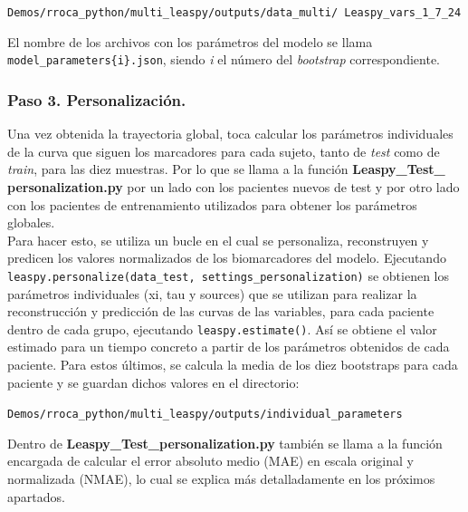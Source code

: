 \begin{center}
	\texttt{Demos/rroca\_python/multi\_leaspy/outputs/data\_multi/
		Leaspy\_vars\_1\_7\_24}
\end{center}

El nombre de los archivos con los parámetros del modelo se llama\\
\texttt{model\_parameters\{i\}.json}, siendo \textit{i} el número del \textit{bootstrap} correspondiente.\\
	
	
\subsubsection{Paso 3. Personalización.}
	
Una vez obtenida la trayectoria global, toca calcular los parámetros individuales de la curva que siguen los marcadores para cada sujeto, tanto de \textit{test} como de \textit{train}, para las diez muestras. Por lo que se llama a la función \textbf{Leaspy\_Test\_
personalization.py} por un lado con los pacientes nuevos de test y por otro lado con los pacientes de entrenamiento utilizados para obtener los parámetros globales.\\

Para hacer esto, se utiliza un bucle en el cual se personaliza, reconstruyen y predicen los valores normalizados de los biomarcadores del modelo. Ejecutando \texttt{leaspy.personalize(data\_test, settings\_personalization)} se obtienen los parámetros individuales (xi, tau y sources) que se utilizan para realizar la reconstrucción y predicción de las curvas de las variables, para cada paciente dentro de cada grupo, ejecutando \texttt{leaspy.estimate()}. Así se obtiene el valor estimado para un tiempo concreto a partir de los parámetros obtenidos de cada paciente. Para estos últimos, se calcula la media de los diez bootstraps para cada paciente y se guardan dichos valores en el directorio:
	
\begin{center}
	\texttt{Demos/rroca\_python/multi\_leaspy/outputs/individual\_parameters}
\end{center}
	
Dentro de \textbf{Leaspy\_Test\_personalization.py} también se llama a la función encargada de calcular el error absoluto medio (MAE) en escala original y normalizada (NMAE), lo cual se explica más detalladamente en los próximos apartados.
	
